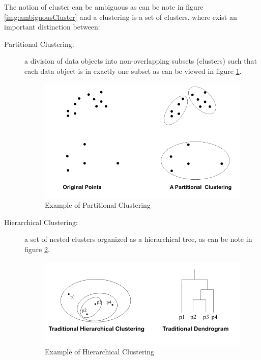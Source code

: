 The notion of cluster can be ambiguous as can be note in figure \ref{img:ambiguousCluster} and a clustering is a set of clusters, where exist
an important distinction between:
\begin{description}
    \item [Partitional Clustering: ] a division of data objects into non-overlapping subsets (clusters) such that each data object is in exactly one subset
    				     as can be viewed in figure \ref{img:partitionalCluster}.

				     \begin{figure}
				         \caption{Example of Partitional Clustering}
					 \label{img:partitionalCluster}
					 \includegraphics[width=\textwidth]{Images/partitional}
				     \end{figure}

    \item [Hierarchical Clustering: ] a set of nested clusters organized as a hierarchical tree, as can be note in figure \ref{img:hierarchicalCluster}.

    				      \begin{figure}
				          \caption{Example of Hierarchical Clustering}
					  \label{img:hierarchicalCluster}
					  \includegraphics[width=\textwidth]{Images/hierarchical}
				      \end{figure}
\end{description}
